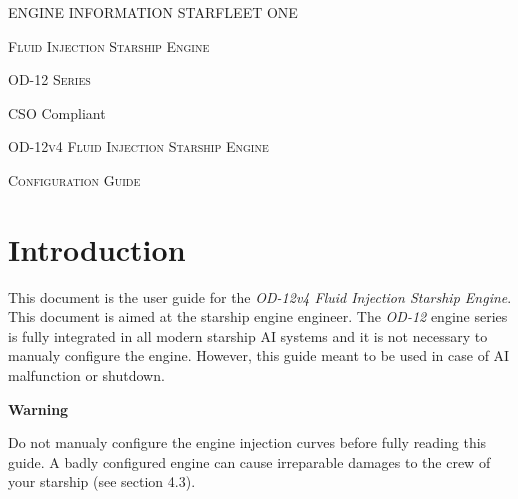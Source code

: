 \documentclass[12pt]{article}
\begin{document}
ENGINE INFORMATION \hspace{7cm} STARFLEET ONE

\noindent\makebox[\linewidth]{\rule{\paperwidth}{1pt}}
\noindent\makebox[\linewidth]{\rule{\paperwidth}{1pt}}

\begin{center}
    \noindent \textsc{Fluid Injection Starship Engine}

    \noindent \textsc{OD-12 Series}
\end{center}

\noindent\makebox[\linewidth]{\rule{\paperwidth}{1pt}}
\noindent\makebox[\linewidth]{\rule{\paperwidth}{1pt}}

\hspace{12.5cm} CSO Compliant

\vspace{4cm}
\begin{center}
    \Large{\textsc{OD-12v4 Fluid Injection Starship Engine}}

    \Huge{\textsc{Configuration Guide}}
\end{center}



\newpage
\tableofcontents





\newpage
\section{Introduction}

This document is the user guide for the \emph{OD-12v4 Fluid Injection Starship Engine}. This document is aimed at the starship engine engineer. The \emph{OD-12} engine series is fully integrated in all modern starship AI systems and it is not necessary to manualy configure the engine. However, this guide meant to be used in case of AI malfunction or shutdown.

\vspace{3cm}
\begin{center}
    \color{red}\Huge{\textbf{Warning}}
\end{center}

Do not manualy configure the engine injection curves before fully reading this guide. A badly configured engine can cause irreparable damages to the crew of your starship (see section 4.3).
\end{document}
